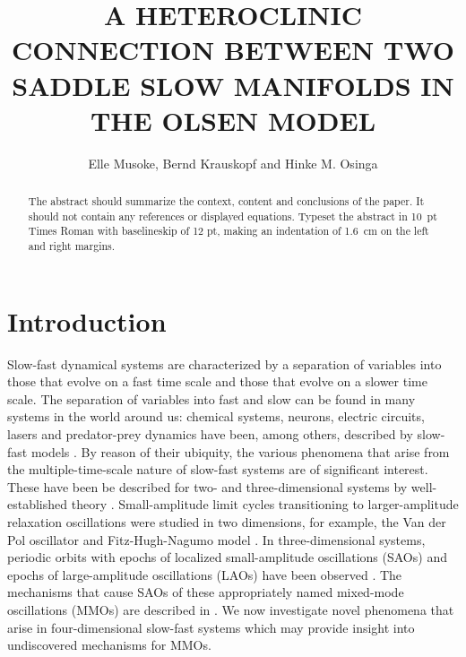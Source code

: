 \documentclass{ws-ijbc}
\begin{document}
\catchline{}{}{}{}{} %


\title{A HETEROCLINIC CONNECTION BETWEEN TWO SADDLE SLOW MANIFOLDS IN THE OLSEN MODEL}

\author{Elle Musoke, Bernd Krauskopf and Hinke M. Osinga}

\address{Department of Mathematics, University of Auckland, Private Bag 92019\\
Auckland, 1142, New Zealand\\
elle.musoke@auckland.ac.nz}

\maketitle

\begin{history}
\end{history}

\begin{abstract}
The abstract should summarize the context, content and conclusions
of the paper. It should not contain any references or displayed
equations. Typeset the abstract in 10~pt Times Roman with
baselineskip of 12 pt, making an indentation of 1.6~cm on the left
and right margins.
\end{abstract}

\section{Introduction}

Slow-fast dynamical systems are characterized by a separation of variables into those that evolve on a fast time scale and those that evolve on a slower time scale.  The separation of variables into fast and slow can be found in many systems in the world around us: chemical systems, neurons, electric circuits, lasers and predator-prey dynamics have been, among others, described by slow-fast models  \cite{BZ_reaction, Neurons,Circuits, lasers, Predator-Prey}.  By reason of their ubiquity, the various phenomena that arise from the multiple-time-scale nature of slow-fast systems are of significant interest. These have been be described for two- and three-dimensional systems by well-established theory \cite{canard_explosion, lents-rapides, enlacement,singular_hopf, folded_node,three}.  Small-amplitude limit cycles transitioning to larger-amplitude relaxation oscillations were studied in two dimensions, for example, the Van der Pol oscillator and Fitz-Hugh-Nagumo model \cite{canard_explosion, fitz-hugh-nagumo}.  In three-dimensional systems, periodic orbits with epochs of localized small-amplitude oscillations (SAOs) and epochs of large-amplitude oscillations (LAOs) have been observed \cite{BZ}.  The mechanisms that cause SAOs of these appropriately named mixed-mode oscillations (MMOs) are described in \cite{MMO}.  We now investigate novel phenomena that arise in four-dimensional slow-fast systems which may provide insight into undiscovered mechanisms for MMOs.
\end{document}
